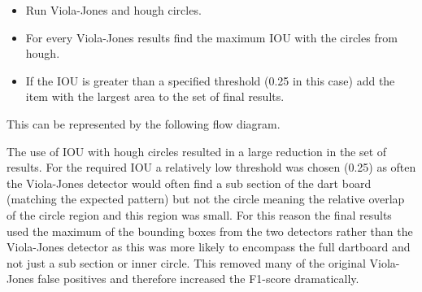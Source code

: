 \documentclass{article}
\begin{document}
\begin{multicols}{2}
\begin{itemize}
  \item Run Viola-Jones and hough circles.
  \item For every Viola-Jones results find the maximum IOU with the circles
    from hough. 
  \item If the IOU is greater than a specified threshold (0.25 in this case)
    add the item with the largest area to the set of final results.
\end{itemize} 

This can be represented by the following flow diagram.

\bigskip


\bigskip

The use of IOU with hough circles resulted in a large reduction in the set of results.
For the required IOU a relatively low threshold was chosen (0.25) as often the
Viola-Jones detector would often find a sub section of the dart board (matching the
expected pattern) but not the circle meaning the relative overlap of the circle
region and this region was small. For this reason the final results used
the maximum of the bounding boxes from the two detectors rather than the
Viola-Jones detector as this was more likely to encompass the full dartboard
and not just a sub section or inner circle. This removed many of the original
Viola-Jones false positives and therefore increased the F1-score dramatically.


\end{multicols}
\end{document}
